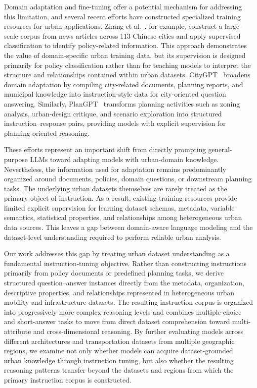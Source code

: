 \documentclass[a4paper,fleqn]{cas-sc}
\begin{document}
Domain adaptation and fine-tuning offer a potential mechanism for addressing this limitation, and several recent efforts have constructed specialized training resources for urban applications. Zhang et al.~\cite{urbanclaim2025}, for example, construct a large-scale corpus from news articles across 113 Chinese cities and apply supervised classification to identify policy-related information. This approach demonstrates the value of domain-specific urban training data, but its supervision is designed primarily for policy classification rather than for teaching models to interpret the structure and relationships contained within urban datasets. CityGPT~\cite{citygpt2024} broadens domain adaptation by compiling city-related documents, planning reports, and municipal knowledge into instruction-style data for city-oriented question answering. Similarly, PlanGPT~\cite{plangpt2024} transforms planning activities such as zoning analysis, urban-design critique, and scenario exploration into structured instruction--response pairs, providing models with explicit supervision for planning-oriented reasoning.

These efforts represent an important shift from directly prompting general-purpose LLMs toward adapting models with urban-domain knowledge. Nevertheless, the information used for adaptation remains predominantly organized around documents, policies, domain questions, or downstream planning tasks. The underlying urban datasets themselves are rarely treated as the primary object of instruction. As a result, existing training resources provide limited explicit supervision for learning dataset schemas, metadata, variable semantics, statistical properties, and relationships among heterogeneous urban data sources. This leaves a gap between domain-aware language modeling and the dataset-level understanding required to perform reliable urban analysis.

Our work addresses this gap by treating urban dataset understanding as a fundamental instruction-tuning objective. Rather than constructing instructions primarily from policy documents or predefined planning tasks, we derive structured question--answer instances directly from the metadata, organization, descriptive properties, and relationships represented in heterogeneous urban mobility and infrastructure datasets. The resulting instruction corpus is organized into progressively more complex reasoning levels and combines multiple-choice and short-answer tasks to move from direct dataset comprehension toward multi-attribute and cross-dimensional reasoning. By further evaluating models across different architectures and transportation datasets from multiple geographic regions, we examine not only whether models can acquire dataset-grounded urban knowledge through instruction tuning, but also whether the resulting reasoning patterns transfer beyond the datasets and regions from which the primary instruction corpus is constructed.
\end{document}
